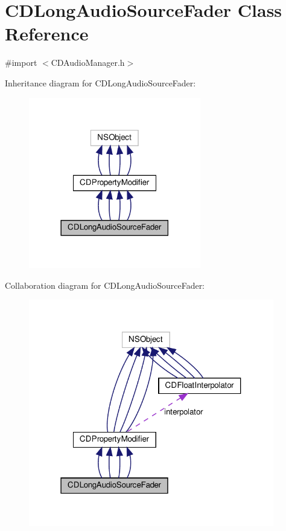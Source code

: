 \hypertarget{interfaceCDLongAudioSourceFader}{}\section{C\+D\+Long\+Audio\+Source\+Fader Class Reference}
\label{interfaceCDLongAudioSourceFader}


{\ttfamily \#import $<$C\+D\+Audio\+Manager.\+h$>$}



Inheritance diagram for C\+D\+Long\+Audio\+Source\+Fader\+:
\nopagebreak
\begin{figure}[H]
\begin{center}
\leavevmode
\includegraphics[width=213pt]{interfaceCDLongAudioSourceFader__inherit__graph}
\end{center}
\end{figure}


Collaboration diagram for C\+D\+Long\+Audio\+Source\+Fader\+:
\nopagebreak
\begin{figure}[H]
\begin{center}
\leavevmode
\includegraphics[width=304pt]{interfaceCDLongAudioSourceFader__coll__graph}
\end{center}
\end{figure}

